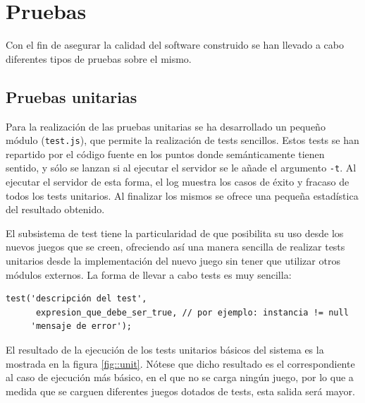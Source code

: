 \section{Pruebas}

Con el fin de asegurar la calidad del software construido se han llevado a cabo diferentes tipos de pruebas sobre el mismo.

\subsection{Pruebas unitarias}

Para la realización de las pruebas unitarias se ha desarrollado un pequeño módulo ({\tt test.js}), que permite la realización de tests sencillos. Estos tests se han repartido por el código fuente en los puntos donde semánticamente tienen sentido, y sólo se lanzan si al ejecutar el servidor se le añade el argumento {\tt -t}. Al ejecutar el servidor de esta forma, el log muestra los casos de éxito y fracaso de todos los tests unitarios. Al finalizar los mismos se ofrece una pequeña estadística del resultado obtenido.

El subsistema de test tiene la particularidad de que posibilita su uso desde los nuevos juegos que se creen, ofreciendo así una manera sencilla de realizar tests unitarios desde la implementación del nuevo juego sin tener que utilizar otros módulos externos. La forma de llevar a cabo tests es muy sencilla:

\begin{verbatim}
test('descripción del test', 
      expresion_que_debe_ser_true, // por ejemplo: instancia != null
     'mensaje de error');
\end{verbatim}

El resultado de la ejecución de los tests unitarios básicos del sistema es la mostrada en la figura \ref{fig::unit}. Nótese que dicho resultado es el correspondiente al caso de ejecución más básico, en el que no se carga ningún juego, por lo que a medida que se carguen diferentes juegos dotados de tests, esta salida será mayor.

